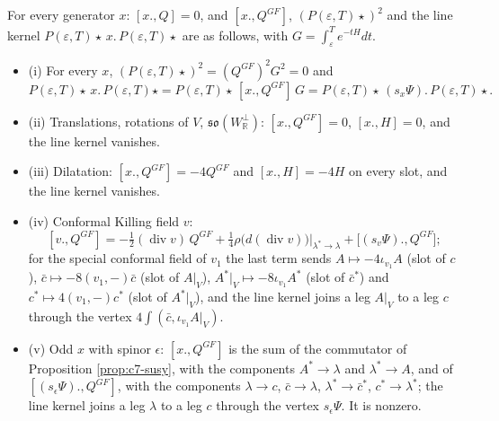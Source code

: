 \begin{proposition}
\label{prop:c3-generators}
For every generator $x$: $[x.,Q]=0$, and $[x.,Q^{GF}]$, $(P(\varepsilon,T)\star)^2$ and the line kernel $P(\varepsilon,T)\star\,x.\,P(\varepsilon,T)\star$ are as follows, with $G=\int_\varepsilon^Te^{-tH}dt$.
\begin{itemize}
\item (i) For every $x$, $(P(\varepsilon,T)\star)^2=(Q^{GF})^2G^2=0$ and
\[
P(\varepsilon,T)\star\,x.\,P(\varepsilon,T)\star=P(\varepsilon,T)\star\,[x.,Q^{GF}]\,G=P(\varepsilon,T)\star\,(s_x\Psi).\,P(\varepsilon,T)\star .
\]
\item (ii) Translations, rotations of $V$, $\mathfrak{so}(W_{\mathbb R}^\perp)$: $[x.,Q^{GF}]=0$, $[x.,H]=0$, and the line kernel vanishes.
\item (iii) Dilatation: $[x.,Q^{GF}]=-4Q^{GF}$ and $[x.,H]=-4H$ on every slot, and the line kernel vanishes.
\item (iv) Conformal Killing field $v$:
\[
[v.,Q^{GF}]=-\tfrac12(\operatorname{div}v)\,Q^{GF}+\tfrac14\rho\big(d(\operatorname{div}v)\big)\big|_{\lambda^*\to\lambda}+\big[(s_v\Psi).,Q^{GF}\big];
\]
for the special conformal field of $v_1$ the last term sends $A\mapsto-4\iota_{v_1}A$ (slot of $c$), $\bar c\mapsto-8(v_1,-)\bar c$ (slot of $A|_V$), $A^*|_V\mapsto-8\iota_{v_1}A^*$ (slot of $\bar c^*$) and $c^*\mapsto4(v_1,-)c^*$ (slot of $A^*|_V$), and the line kernel joins a leg $A|_V$ to a leg $c$ through the vertex $4\int(\bar c,\iota_{v_1}A|_V)$.
\item (v) Odd $x$ with spinor $\epsilon$: $[x.,Q^{GF}]$ is the sum of the commutator of Proposition \ref{prop:c7-susy}, with the components $A^*\to\lambda$ and $\lambda^*\to A$, and of $[(s_\epsilon\Psi).,Q^{GF}]$, with the components $\lambda\to c$, $\bar c\to\lambda$, $\lambda^*\to\bar c^*$, $c^*\to\lambda^*$; the line kernel joins a leg $\lambda$ to a leg $c$ through the vertex $s_\epsilon\Psi$. It is nonzero.
\end{itemize}
\end{proposition}

